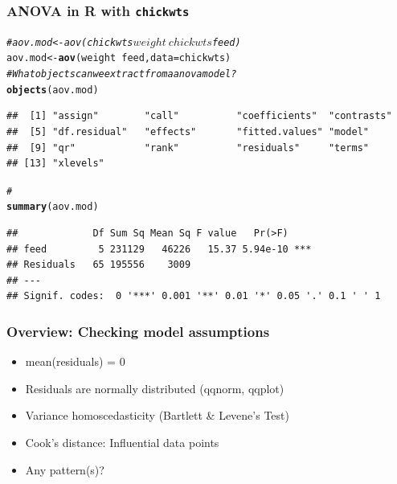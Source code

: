 \documentclass{beamer}\usepackage[]{graphicx}\usepackage[]{color}
\makeatletter
\newcommand{\hlcom}[1]{\textcolor[rgb]{0.678,0.584,0.686}{\textit{#1}}}%
\newcommand{\hlopt}[1]{\textcolor[rgb]{0,0,0}{#1}}%
\newcommand{\hlstd}[1]{\textcolor[rgb]{0.345,0.345,0.345}{#1}}%
\newcommand{\hlkwb}[1]{\textcolor[rgb]{0.69,0.353,0.396}{#1}}%
\newcommand{\hlkwc}[1]{\textcolor[rgb]{0.333,0.667,0.333}{#1}}%
\newcommand{\hlkwd}[1]{\textcolor[rgb]{0.737,0.353,0.396}{\textbf{#1}}}%
\newenvironment{kframe}{%
 \def\at@end@of@kframe{}%
 \ifinner\ifhmode%
  \def\at@end@of@kframe{\end{minipage}}%
  \begin{minipage}{\columnwidth}%
 \fi\fi%
 \def\FrameCommand##1{\hskip\@totalleftmargin \hskip-\fboxsep
 \colorbox{shadecolor}{##1}\hskip-\fboxsep
     \hskip-\linewidth \hskip-\@totalleftmargin \hskip\columnwidth}%
 \MakeFramed {\advance\hsize-\width
   \@totalleftmargin\z@ \linewidth\hsize
   \@setminipage}}%
 {\par\unskip\endMakeFramed%
 \at@end@of@kframe}
\newenvironment{knitrout}{}{} %
\makeatother
\begin{document}
{{{\begin{frame}[fragile]
\begin{knitrout}
\end{knitrout}
\end{frame}


\begin{frame}[fragile]
\frametitle{ANOVA in R with \texttt{chickwts}}
\begin{knitrout}\scriptsize
{}\color{fgcolor}\begin{kframe}
\begin{alltt}
\hlcom{# aov.mod <- aov(chickwts$weight ~ chickwts$feed)}
\hlstd{aov.mod} \hlkwb{<-} \hlkwd{aov}\hlstd{(weight} \hlopt{~} \hlstd{feed,} \hlkwc{data} \hlstd{= chickwts)}
\hlcom{# What objects can we extract from a anova model?}
\hlkwd{objects}\hlstd{(aov.mod)}
\end{alltt}
\begin{verbatim}
##  [1] "assign"        "call"          "coefficients"  "contrasts"    
##  [5] "df.residual"   "effects"       "fitted.values" "model"        
##  [9] "qr"            "rank"          "residuals"     "terms"        
## [13] "xlevels"
\end{verbatim}
\begin{alltt}
\hlcom{#}
\hlkwd{summary}\hlstd{(aov.mod)}
\end{alltt}
\begin{verbatim}
##             Df Sum Sq Mean Sq F value   Pr(>F)    
## feed         5 231129   46226   15.37 5.94e-10 ***
## Residuals   65 195556    3009                     
## ---
## Signif. codes:  0 '***' 0.001 '**' 0.01 '*' 0.05 '.' 0.1 ' ' 1
\end{verbatim}
\end{kframe}
\end{knitrout}
\end{frame}


\usebackgroundtemplate{}
\begin{frame}
\frametitle{Overview: Checking model assumptions}
\begin{itemize}
\setlength\itemsep{1.2em}
\item mean(residuals) = 0
\item Residuals are normally distributed (qqnorm, qqplot)
\item Variance homoscedasticity (Bartlett \& Levene's Test)
\item Cook's distance: Influential data points
\item Any pattern(s)?
\end{itemize}
\end{frame}

}}}
\end{document}
